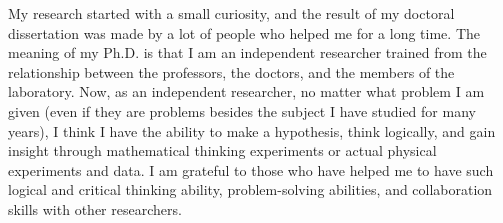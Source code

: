 


My research started with a small curiosity, and the result of my doctoral dissertation was made by a lot of people who helped me for a long time. The meaning of my Ph.D. is that I am an independent researcher trained from the relationship between the professors, the doctors, and the members of the laboratory. Now, as an independent researcher, no matter what problem I am given (even if they are problems besides the subject I have studied for many years), I think I have the ability to make a hypothesis, think logically, and gain insight through mathematical thinking experiments or actual physical experiments and data. I am grateful to those who have helped me to have such logical and critical thinking ability, problem-solving abilities, and collaboration skills with other researchers. 

